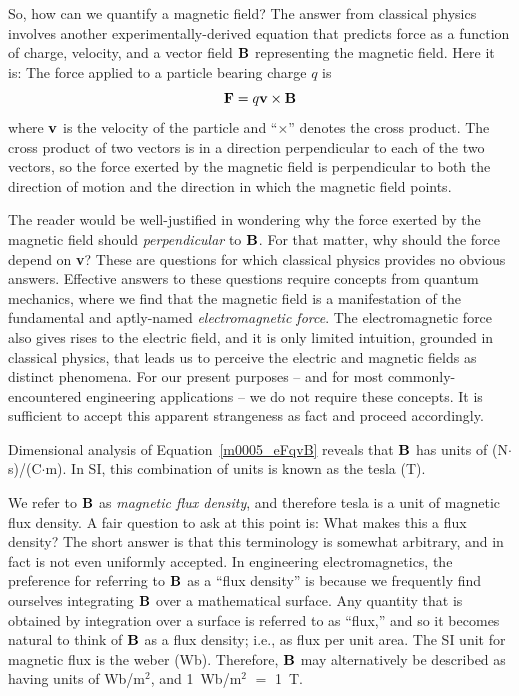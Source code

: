 So, how can we quantify a magnetic field?
The answer from classical physics involves another experimentally-derived equation that predicts force as a function of charge, velocity, and a vector field ${\bf B}$ representing the magnetic field.
Here it is:
The force 
applied to a particle bearing charge $q$ is 
%
\begin{equation}
{\bf F} = q{\bf v} \times {\bf B}
\label{m0005_eFqvB}
\end{equation}  
%
where ${\bf v}$ is the velocity of the particle and 
``$\times$'' denotes the cross product.  
The cross product of two vectors is in a direction perpendicular to each of the two vectors, so the force exerted by the magnetic field is perpendicular to both the direction of motion and the direction in which the magnetic field points.

The reader would be well-justified in wondering why the force exerted by the magnetic field should \emph{perpendicular} to ${\bf B}$.  
For that matter, why should the force depend on {\bf v}?
These are questions for which classical physics provides no obvious answers. 
Effective answers to these questions require concepts from quantum mechanics,
where we find that the magnetic field is a manifestation of the fundamental and aptly-named \emph{electromagnetic force}.
The electromagnetic force also gives rises to the electric field, and it is only limited intuition, grounded in classical physics, that leads us to perceive the electric and magnetic fields as distinct phenomena. 
For our present purposes -- and for most commonly-encountered engineering applications -- we do not require these concepts.
It is sufficient to accept this apparent strangeness as fact and proceed accordingly.

Dimensional analysis of Equation~\ref{m0005_eFqvB} reveals that ${\bf B}$ has units of (N$\cdot$s)/(C$\cdot$m).  
In SI, this combination of units is known as the tesla (T). 

We refer to ${\bf B}$ as \emph{magnetic flux density}, and therefore tesla is a unit of magnetic flux density.
A fair question to ask at this point is: What makes this a flux density?
The short answer is that this terminology is somewhat arbitrary, and in fact is not even uniformly accepted.
In engineering electromagnetics, the preference for referring to ${\bf B}$ as a ``flux density'' is because we frequently find ourselves integrating ${\bf B}$ over a mathematical surface.  
Any quantity that is obtained by integration over a surface is referred to as ``flux,''
and so it becomes natural to think of ${\bf B}$ as a flux density; i.e., as flux per unit area.  
The SI unit for magnetic flux is the weber (Wb).
Therefore, ${\bf B}$ may alternatively be described as having units of Wb/m$^2$, and 1~Wb/m$^2$ $=$ 1~T.

